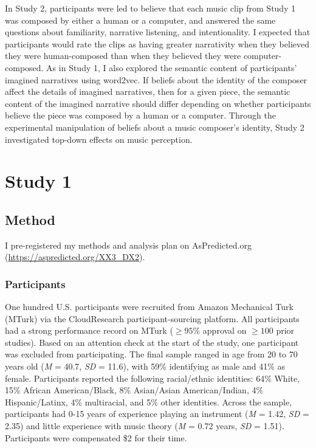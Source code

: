 \documentclass[12pt,twoside]{reedthesis}
\begin{document}
In Study 2, participants were led to believe that each music clip from Study 1 was composed by either a human or a computer, and answered the same questions about familiarity, narrative listening, and intentionality. I expected that participants would rate the clips as having greater narrativity when they believed they were human-composed than when they believed they were computer-composed. As in Study 1, I also explored the semantic content of participants’ imagined narratives using word2vec. If beliefs about the identity of the composer affect the details of imagined narratives, then for a given piece, the semantic content of the imagined narrative should differ depending on whether participants believe the piece was composed by a human or a computer. Through the experimental manipulation of beliefs about a music composer’s identity, Study 2 investigated top-down effects on music perception.  

\chapter*{Study 1}

\section{Method}

I pre-registered my methods and analysis plan on AsPredicted.org (\url{https://aspredicted.org/XX3_DX2}).

\subsection{Participants}
One hundred U.S. participants were recruited from Amazon Mechanical Turk (MTurk) via the CloudResearch participant-sourcing platform. All participants had a strong performance record on MTurk ($\ge95\%$ approval on $\ge100$ prior studies). Based on an attention check at the start of the study, one participant was excluded from participating. The final sample ranged in age from 20 to 70 years old (\emph{M} = 40.7, \emph{SD} = 11.6), with 59\% identifying as male and 41\% as female. Participants reported the following racial/ethnic identities: 64\% White, 15\% African American/Black, 8\% Asian/Asian American/Indian, 4\% Hispanic/Latinx, 4\% multiracial, and 5\% other identities. Across the sample, participants had 0-15 years of experience playing an instrument (\emph{M} = 1.42, \emph{SD} = 2.35) and little experience with music theory (\emph{M} = 0.72 years, \emph{SD} = 1.51). Participants were compensated \$2 for their time. 
\end{document}
